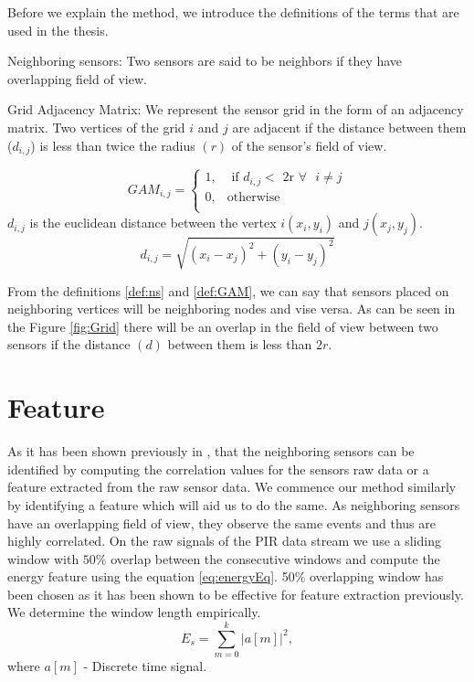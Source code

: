 Before we explain the method, we introduce the definitions of the terms that are used in the thesis.
\begin{definition}{Neighboring sensors:}
 Two sensors are said to be neighbors if they have overlapping field of view.
\label{def:ns}
\end{definition}
\begin{definition}{Grid Adjacency Matrix:}
 We represent the sensor grid in the form of an adjacency matrix. Two vertices of the grid $i$ and $j$ are adjacent if the distance between them ($d_{i,j}$) is less than twice the radius $(r)$ of the sensor's field of view.

\[
GAM_{i,j} = 
\begin{cases}
1, &\text{ if } d_{i,j} < \text{  2r } \forall \text{ } i \ne j\\
0, & \text{otherwise}\\
\end{cases}
    \]
$d_{i,j}$  is the euclidean distance between the vertex $ i(x_i,y_i)$ and $j(x_j,y_j)$.
\begin{equation*}
d_{i,j}=\sqrt{(x_i-x_j)^2 + (y_i-y_j)^2}
\end{equation*}
\label{def:GAM}
\end{definition}
From the definitions \ref{def:ns} and \ref{def:GAM}, we can say that sensors placed on neighboring vertices will be neighboring nodes and vise versa. As can be seen in the Figure \ref{fig:Grid} there will be an overlap in the field of view between two sensors if the distance $(d)$ between them is less than $2r$.

\section{Feature}
As it has been shown previously in \cite{Hong:2013:TAS:2528282.2528302,doi:10.1061/9780784413616.226,Koc:2014:CLC:2674061.2674075}, that the neighboring sensors can be identified by computing the correlation values for the sensors raw data or a feature extracted from the raw sensor data. We commence our method similarly by identifying a feature which will aid us to do the same. As neighboring sensors have an overlapping field of view, they observe the same events and thus are highly correlated. On the raw signals of the PIR data stream we use a sliding window with $50\%$ overlap between the consecutive windows and compute the energy feature using the equation \ref{eq:energyEq}. 50\% overlapping window has been chosen as it has been shown to be effective for feature extraction previously\cite{bao2004activity}. We determine the window length empirically.
\begin{equation}
\label{eq:energyEq}
E_s = {\sum_{m=0}^{k}{|a[m]|}^2},
\end{equation}
where $a[m]$ - Discrete time signal.

